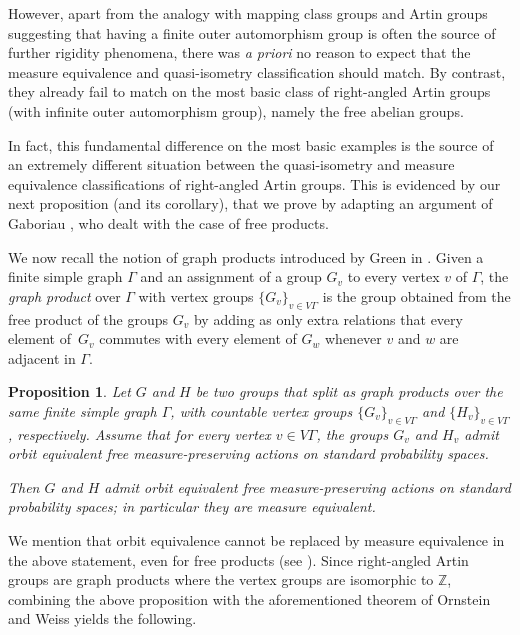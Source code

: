 \documentclass[JEP,XML,SOM,Unicode,NoFloatCountersInSection,published]{cedram}
\theoremstyle{plain}
\newtheorem{propintro}[theointro]{Proposition}
\theoremstyle{definition}
\begin{document}
However, apart from the analogy with mapping class groups and Artin groups suggesting that having a finite outer automorphism group is often the source of further rigidity phenomena, there was \emph{a priori} no reason to expect that the measure equivalence and quasi-isometry classification should match. By contrast, they already fail to match on the most basic class of right-angled Artin groups (with infinite outer automorphism group), namely the free abelian groups.

In fact, this fundamental difference on the most basic examples is the source of an extremely different situation between the quasi-isometry and measure equivalence classifications of right-angled Artin groups. This is evidenced by our next proposition (and its corollary), that we prove by adapting an argument of Gaboriau \cite{Gab-cost,Gab}, who dealt with the case of free products.

We now recall the notion of graph products introduced by Green in \cite{green1990graph}. Given a finite simple graph $\Gamma$ and an assignment of a group $G_v$ to every vertex $v$ of $\Gamma$, the \emph{graph product} over $\Gamma$ with vertex groups $\{G_v\}_{v\in V\Gamma}$ is the group obtained from the free product of the groups $G_v$ by adding as only extra relations that every element of~$G_v$ commutes with every element of $G_w$ whenever $v$ and $w$ are adjacent in $\Gamma$.

\begin{propintro}\label{propintro:graph-products}
Let $G$ and $H$ be two groups that split as graph products over the same finite simple graph $\Gamma$, with countable vertex groups $\{G_v\}_{v\in V\Gamma}$ and $\{H_v\}_{v\in V\Gamma}$, respectively. Assume that for every vertex $v\in V\Gamma$, the groups $G_v$ and $H_v$ admit orbit equivalent free measure-preserving actions on standard probability spaces.

Then $G$ and $H$ admit orbit equivalent free measure-preserving actions on standard probability spaces; in particular they are measure equivalent.
\end{propintro}

We mention that orbit equivalence cannot be replaced by measure equivalence in the above statement, even for free products (see \cite[\S 2.2]{Gab}). Since right-angled Artin groups are graph products where the vertex groups are isomorphic to $\mathbb{Z}$, combining the above proposition with the aforementioned theorem of Ornstein and Weiss \cite{OW} yields the following.
\end{document}
